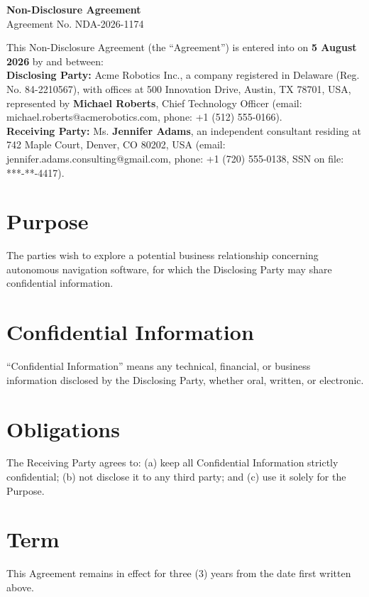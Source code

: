 \documentclass[11pt,a4paper]{article}
\begin{document}
\begin{center}
{\LARGE\bfseries\color{accent} Non-Disclosure Agreement}\\[0.3em]
{\small Agreement No. NDA-2026-1174}
\end{center}
\vspace{0.6em}

This Non-Disclosure Agreement (the ``Agreement'') is entered into on
\textbf{5 August 2026} by and between:\\[0.6em]
\textbf{Disclosing Party:} Acme Robotics Inc., a company registered in Delaware
(Reg. No. 84-2210567), with offices at 500 Innovation Drive, Austin, TX 78701, USA,
represented by \textbf{Michael Roberts}, Chief Technology Officer
(email: michael.roberts@acmerobotics.com, phone: +1 (512) 555-0166).\\[0.6em]
\textbf{Receiving Party:} Ms. \textbf{Jennifer Adams}, an independent consultant residing at
742 Maple Court, Denver, CO 80202, USA
(email: jennifer.adams.consulting@gmail.com, phone: +1 (720) 555-0138,
SSN on file: ***-**-4417).

\section{Purpose}
The parties wish to explore a potential business relationship concerning autonomous
navigation software, for which the Disclosing Party may share confidential information.

\section{Confidential Information}
``Confidential Information'' means any technical, financial, or business information
disclosed by the Disclosing Party, whether oral, written, or electronic.

\section{Obligations}
The Receiving Party agrees to: (a) keep all Confidential Information strictly
confidential; (b) not disclose it to any third party; and (c) use it solely for the Purpose.

\section{Term}
This Agreement remains in effect for three (3) years from the date first written above.
\end{document}

